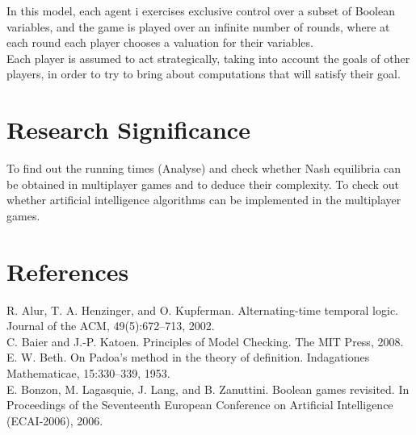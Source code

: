 \documentclass[14pt, a4paper]{article}
\begin{document}
	In this model, each agent i exercises exclusive control over a subset of Boolean variables, and the game is played over an infinite number of rounds, where at each round each player chooses a valuation for their variables.\\

	Each player is assumed to act strategically, taking into account the goals of other players,
in order to try to bring about computations that will satisfy their goal.\\

			
			\section{Research Significance}
			
				To find out the running times (Analyse) and check whether Nash equilibria can be obtained in multiplayer games and to deduce their complexity.
				To check out whether artificial intelligence algorithms can be implemented in the multiplayer 
games.

			
			\section{References}
R. Alur, T. A. Henzinger, and O. Kupferman. Alternating-time
temporal logic. Journal of the ACM, 49(5):672–713, 2002.\\
C. Baier and J.-P. Katoen. Principles of Model Checking. The
MIT Press, 2008.\\
E. W. Beth. On Padoa’s method in the theory of definition.
Indagationes Mathematicae, 15:330–339, 1953.\\
E. Bonzon, M. Lagasquie, J. Lang, and B. Zanuttini. Boolean
games revisited. In Proceedings of the Seventeenth European
Conference on Artificial Intelligence (ECAI-2006), 2006.\\
				
	

	
\end{document}
